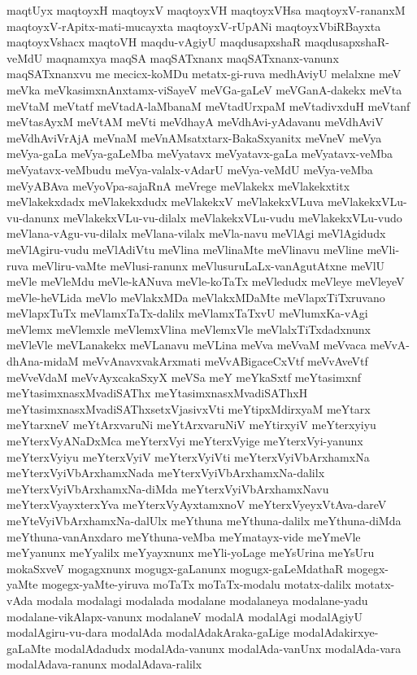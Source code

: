 {maqtUyx
maqtoyxH
maqtoyxV
maqtoyxVH
maqtoyxVHsa
maqtoyxV-rananxM
maqtoyxV-rApitx-mati-mucayxta
maqtoyxV-rUpANi
maqtoyxVbiRBayxta
maqtoyxVshacx
maqtoVH
maqdu-vAgiyU
maqdusapxshaR
maqdusapxshaR-veMdU
maqnamxya
maqSA
maqSATxnanx
maqSATxnanx-vanunx
maqSATxnanxvu
me
mecicx-koMDu
metatx-gi-ruva
medhAviyU
melalxne
meV
meVka
meVkasimxnAnxtamx-viSayeV
meVGa-gaLeV
meVGanA-dakekx
meVta
meVtaM
meVtatf
meVtadA-laMbanaM
meVtadUrxpaM
meVtadivxduH
meVtanf
meVtasAyxM
meVtAM
meVti
meVdhayA
meVdhAvi-yAdavanu
meVdhAviV
meVdhAviVrAjA
meVnaM
meVnAMsatxtarx-BakaSxyanitx
meVneV
meVya
meVya-gaLa
meVya-gaLeMba
meVyatavx
meVyatavx-gaLa
meVyatavx-veMba
meVyatavx-veMbudu
meVya-valalx-vAdarU
meVya-veMdU
meVya-veMba
meVyABAva
meVyoVpa-sajaRnA
meVrege
meVlakekx
meVlakekxtitx
meVlakekxdadx
meVlakekxdudx
meVlakekxV
meVlakekxVLuva
meVlakekxVLu-vu-danunx
meVlakekxVLu-vu-dilalx
meVlakekxVLu-vudu
meVlakekxVLu-vudo
meVlana-vAgu-vu-dilalx
meVlana-vilalx
meVla-navu
meVlAgi
meVlAgidudx
meVlAgiru-vudu
meVlAdiVtu
meVlina
meVlinaMte
meVlinavu
meVline
meVli-ruva
meVliru-vaMte
meVlusi-ranunx
meVlusuruLaLx-vanAgutAtxne
meVlU
meVle
meVleMdu
meVle-kANuva
meVle-koTaTx
meVledudx
meVleye
meVleyeV
meVle-heVLida
meVlo
meVlakxMDa
meVlakxMDaMte
meVlapxTiTxruvano
meVlapxTuTx
meVlamxTaTx-dalilx
meVlamxTaTxvU
meVlumxKa-vAgi
meVlemx
meVlemxle
meVlemxVlina
meVlemxVle
meVlalxTiTxdadxnunx
meVleVle
meVLanakekx
meVLanavu
meVLina
meVva
meVvaM
meVvaca
meVvA-dhAna-midaM
meVvAnavxvakArxmati
meVvABigaceCxVtf
meVvAveVtf
meVveVdaM
meVvAyxcakaSxyX
meVSa
meY
meYkaSxtf
meYtasimxnf
meYtasimxnasxMvadiSAThx
meYtasimxnasxMvadiSAThxH
meYtasimxnasxMvadiSAThxsetxVjasivxVti
meYtipxMdirxyaM
meYtarx
meYtarxneV
meYtArxvaruNi
meYtArxvaruNiV
meYtirxyiV
meYterxyiyu
meYterxVyANaDxMca
meYterxVyi
meYterxVyige
meYterxVyi-yanunx
meYterxVyiyu
meYterxVyiV
meYterxVyiVti
meYterxVyiVbArxhamxNa
meYterxVyiVbArxhamxNada
meYterxVyiVbArxhamxNa-dalilx
meYterxVyiVbArxhamxNa-diMda
meYterxVyiVbArxhamxNavu
meYterxVyayxterxYva
meYterxVyAyxtamxnoV
meYterxVyeyxVtAva-dareV
meYteVyiVbArxhamxNa-dalUlx
meYthuna
meYthuna-dalilx
meYthuna-diMda
meYthuna-vanAnxdaro
meYthuna-veMba
meYmatayx-vide
meYmeVle
meYyanunx
meYyalilx
meYyayxnunx
meYli-yoLage
meYsUrina
meYsUru
mokaSxveV
mogagxnunx
mogugx-gaLanunx
mogugx-gaLeMdathaR
mogegx-yaMte
mogegx-yaMte-yiruva
moTaTx
moTaTx-modalu
motatx-dalilx
motatx-vAda
modala
modalagi
modalada
modalane
modalaneya
modalane-yadu
modalane-vikAlapx-vanunx
modalaneV
modalA
modalAgi
modalAgiyU
modalAgiru-vu-dara
modalAda
modalAdakAraka-gaLige
modalAdakirxye-gaLaMte
modalAdadudx
modalAda-vanunx
modalAda-vanUnx
modalAda-vara
modalAdava-ranunx
modalAdava-ralilx
}
